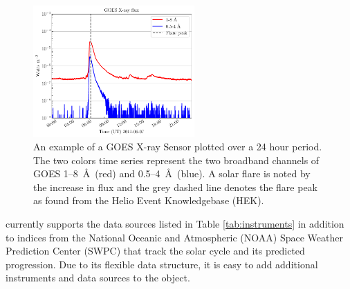 \begin{figure}
    \centering
    \includegraphics[width=0.55\textwidth]{figures/timeseries_example.pdf}
    \caption{An example of a GOES X-ray Sensor \Timeseries plotted over a 24 hour period. The two colors time series represent the two broadband channels of GOES 1--8~\AA\ (red) and 0.5--4~\AA\ (blue).  A solar flare is noted by the increase in flux and the grey dashed line denotes the flare peak as found from the Helio Event Knowledgebase (HEK).}
    \label{fig:timeseries_example}
\end{figure}

\Timeseries currently supports the data sources listed in Table \ref{tab:instruments} in addition to indices from the National Oceanic and Atmospheric (NOAA) Space Weather Prediction Center (SWPC) that track the solar cycle and its predicted progression. Due to its flexible data structure, it is easy to add additional instruments and data sources to the \Timeseries object.


